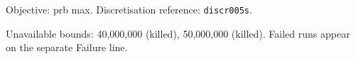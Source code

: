\documentclass[a4paper,10pt]{article}
\begin{document}
\noindent\begin{minipage}{\linewidth}
\section*{\small\texttt{}}
Objective: prb max. Discretisation reference: \texttt{discr005s}.

\begin{minipage}[t]{0.48\linewidth}\centering

\end{minipage}
\hfill
\begin{minipage}[t]{0.48\linewidth}\centering

\end{minipage}
\par\medskip
Unavailable bounds: 40,000,000 (killed), 50,000,000 (killed). Failed runs appear on the separate Failure line.

\end{minipage}\par\bigskip
\end{document}
